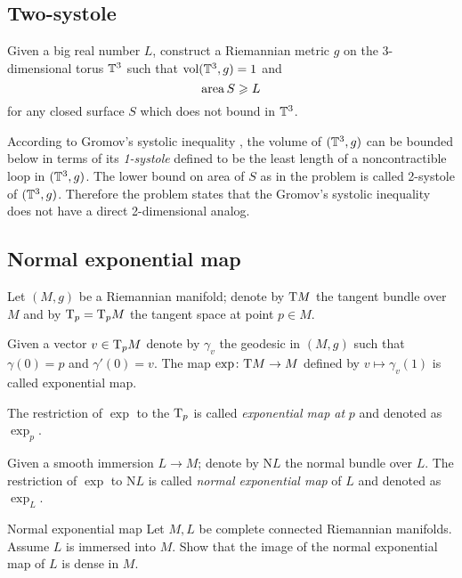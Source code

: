 \subsection*{Two-systole}

\begin{pr}{} Given a big real number $L$,
construct a Riemannian metric $g$ on the 3-dimensional torus $\mathbb{T}^3$ such that $\operatorname{\rm vol}(\mathbb{T}^3,g)=1$
and \[\operatorname{\rm area} S\geqslant L\]
for any closed surface $S$ which does not bound in $\mathbb{T}^3$.
\end{pr}

According to Gromov's systolic inequality \cite[see][]{gromov-filling}, the volume of $(\mathbb{T}^3,g)$ can be bounded below in terms of its \emph{1-systole} defined to be the least length of a noncontractible loop in $(\mathbb{T}^3,g)$.
The lower bound on area of $S$ as in the problem is called 2-systole of $(\mathbb{T}^3,g)$.
Therefore the problem states that the Gromov's systolic inequality does not have a direct 2-dimensional analog.

\subsection*{Normal exponential map\easy}

\label{page:Normal exponential map}

Let $(M,g)$ be a Riemannian manifold;
denote by $\mathrm{T} M$ the tangent bundle over $M$ and by $\mathrm{T}_p=\mathrm{T}_pM$ the tangent space at point $p\in M$.

Given a vector $v\in\mathrm{T}_pM$ denote by $\gamma_v$ the geodesic in $(M,g)$
such that $\gamma(0)=p$ and $\gamma'(0)=v$.
The map $\exp\colon\mathrm{T} M\to M$ defined by $v\mapsto \gamma_v(1)$ is called exponential map.

The restriction of $\exp$ to the $\mathrm{T}_p$ is called \emph{exponential map at} $p$ and denoted as $\exp_p$.

Given a smooth immersion $L\to M$;
denote by $\mathrm{N} L$ the normal bundle over $L$.
The restriction of $\exp$ to $\mathrm{N} L$ is called {}\emph{normal exponential map} of $L$ and denoted as $\exp_L$.

\begin{pr}{\easy}{Normal exponential map}\label{Normal exponential map}
Let $M,L$ be complete connected Riemannian manifolds.
Assume $L$ is immersed into $M$.
Show that the image  of the 
normal exponential map of $L$ is dense in $M$.
\end{pr}

